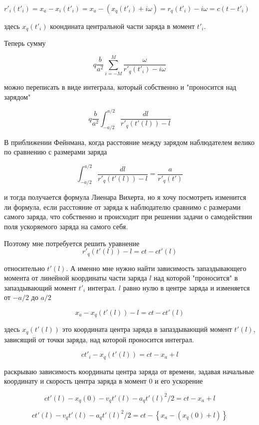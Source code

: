 \documentclass{article}
\begin{document}
$r'_{i}\left(t'_{i}\right)=x_a-x_i\left(t'_{i}\right)=x_a-\left(x_q\left(t'_{i}\right)+i \omega\right)=r_q\left(t'_{i}\right)-i \omega=c\left(t - t'_{i}\right)$

здесь $x_q\left(t'_{i}\right)$ коондината центральной части заряда в момент $t'_{i}$.


Теперь сумму

$$q \frac{b}{a^2}\sum\limits_{i=-M}^M \frac{\omega }{r'_{q}(t'_{i})-i \omega}$$


можно переписать в виде интеграла, который собственно и "проносится над зарядом"

$$q \frac{b}{a^2}\int_{-a/2}^{a/2} \frac{dl }{r'_{q}(t'(l))-l}$$

В приближении Фейнмана, когда расстояние между зарядом наблюдателем велико по сравнению с размерами заряда

$$\int_{-a/2}^{a/2} \frac{dl }{r'_{q}(t'(l))-l} = \frac{a}{r'_{q}(t')}$$

и тогда получается формула Лиенара Вихерта, но я хочу посмотреть изменится ли формула, если расстояние от заряда к наблюдателю сравнимо с размерами самого заряда, что собственно и происходит при решении задачи о самодействии поля ускоряемого заряда на самого себя.

Поэтому мне потребуется решить уравнение
$$r'_{q}(t'(l))-l= c t - c t'(l)$$

относительно $t'(l)$. А именно мне нужно найти зависимость запаздывающего момента от линейной координаты части заряда $l$ над которой "проносится" в запаздывающий момент  $t'_{i}$ интеграл. $l$ равно нулю в центре заряда и изменяется от $-a/2$ до ${a/2}$

$$x_a-x_q\left(t'(l)\right)-l= c t - c t'(l)$$

здесь $x_q\left(t'(l)\right)$ это координата центра заряда в запаздывающий момент $t'(l)$, зависящий от точки заряда, над которой проносится интеграл.

$$ c t'_{i}-x_q\left(t'(l)\right)= c t - x_a+l$$

раскрываю зависимость координаты центра заряда от времени, задавая начальные координату и скорость центра заряда в момент 0 и его ускорение

$$ c t'(l)-x_{q}(0) - v_q t'(l) - a_q {t'(l)}^{2} / 2 = c t - x_a+l$$

$$ c t'(l) - v_q t'(l) - a_q {t'(l)}^{2} / 2 = c t - \left\{x_a - (x_{q}(0) + l)\right\}$$
\end{document}
